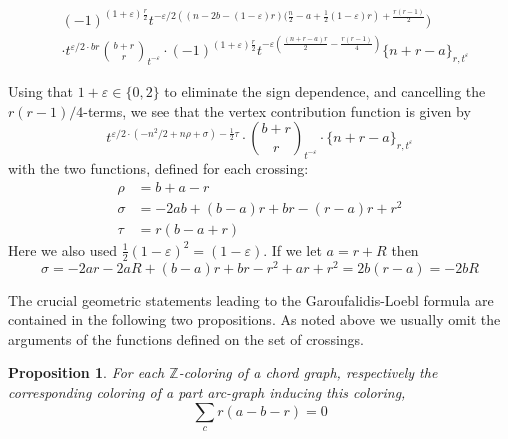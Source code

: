 \documentclass[11pt]{article}
\newtheorem{prop}{Proposition}[section]
\theoremstyle{definition}
\theoremstyle{remark}
\theoremstyle{remark}
\begin{document}
\begin{align*}
&(-1)^{(1+\varepsilon)\frac{r}{2}}t^{-\varepsilon /2\left((n-2b-(1-\varepsilon )r)(\frac{n}{2}-a+\frac{1}{2}(1-\varepsilon )r \right)+\frac{r(r-1)}{2}})\\
&\cdot  t^{\varepsilon /2 \cdot br}{{b+r}\choose {r}}_{t^{-\varepsilon}}\cdot (-1)^{(1+\varepsilon )\frac{r}{2}}t^{-\varepsilon (\frac{(n+r-a)r}{2}-\frac{r(r-1)}{4})}  \{n+r-a\}_{r,t^{\varepsilon }}
\end{align*}

\noindent Using that $1+\varepsilon \in \{0,2\}$ to eliminate the sign dependence, and cancelling the $r(r-1)/4$-terms, we see that the vertex contribution function is given by
\begin{equation}\label{eq=vertex contribution}
t^{\varepsilon /2\cdot (-n^2/2+ n\rho +\sigma)-\frac{1}{2}\tau}\cdot {{b+r}\choose {r}}_{t^{-\varepsilon}}\cdot \{n+r-a\}_{r,t^{\varepsilon }}
\end{equation}
with the two functions, defined for each crossing:
\begin{align*}
\rho &=b+a-r \\
\sigma& =-2ab+(b-a)r+br-(r-a)r+r^2 \\
\tau&=r(b-a+r)
\end{align*}
Here we also used $\frac{1}{2}(1-\varepsilon )^2=(1-\varepsilon )$.
If we let $a=r+R$ then 
$$\sigma =-2ar-2aR+(b-a)r+br-r^2+ar+r^2=2b(r-a)=-2bR$$


\vskip 0.1in

\noindent The crucial geometric statements leading to the Garoufalidis-Loebl  formula are contained in the following
two propositions. As noted above we usually omit the arguments of the functions defined on the set of crossings.

\vskip 0.1in

\begin{prop} For each $\mathbb{Z}$-coloring of a chord graph, respectively the corresponding coloring of a part arc-graph inducing this coloring,
$$\sum_cr(a-b-r)=0$$
\end{prop}

\vskip 0.1in
\end{document}
